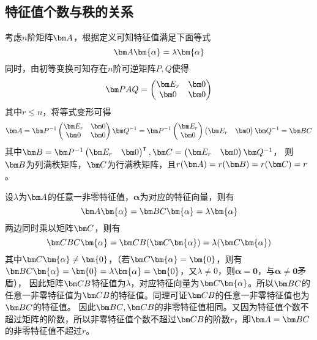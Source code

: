 \subsection{特征值个数与秩的关系}
考虑$n$阶矩阵$\mat{A}$，根据定义可知特征值满足下面等式
\[ \mat{A}\bm{\alpha} = \lambda\bm{\alpha} \]
同时，由初等变换可知存在$n$阶可逆矩阵$P,Q$使得
\[
    \mat{PAQ} =
    \begin{pmatrix}
        \mat{E_r} & \mat{0} \\
        \mat{0}   & \mat{0}
    \end{pmatrix}
\]
其中$r\leq n$，将等式变形可得
\[
    \mat{A} =
    \mat{P}^{-1}
    \begin{pmatrix}
        \mat{E_r} & \mat{0} \\
        \mat{0}   & \mat{0}
    \end{pmatrix}
    \mat{Q}^{-1}
    =
    \mat{P}^{-1}
    \begin{pmatrix}
        \mat{E_r} \\ \mat{0}
    \end{pmatrix}
    \begin{pmatrix}
        \mat{E_r} & \mat{0}
    \end{pmatrix}
    \mat{Q}^{-1}
    =\mat{BC}
\]
其中$\mat{B}=\mat{P}^{-1}\begin{pmatrix}\mat{E_r} & \mat{0}\end{pmatrix}^\intercal, \mat{C} = \begin{pmatrix}\mat{E_r} & \mat{0}\end{pmatrix}\mat{Q}^{-1}$，
则$\mat{B}$为列满秩矩阵，$\mat{C}$为行满秩矩阵，且$r(\mat{A}) = r(\mat{B}) = r(\mat{C}) = r$。

设$\lambda$为$\mat{A}$的任意一非零特征值，$\bm{\alpha}$为对应的特征向量，则有
\[ \mat{A}\bm{\alpha} = \mat{BC}\bm{\alpha} = \lambda\bm{\alpha} \]
两边同时乘以矩阵$\mat{C}$，则有
\[ \mat{CBC}\bm{\alpha} = \mat{CB}(\mat{C}\bm{\alpha}) = \lambda(\mat{C}\bm{\alpha}) \]
其中$\mat{C}\bm{\alpha}\neq \bm{0}$，（若$\mat{C}\bm{\alpha} = \bm{0}$，则有$\mat{BC}\bm{\alpha} = \bm{0} = \lambda\bm{\alpha} = \bm{0}$，又$\lambda\neq 0$，则$\bm{\alpha}=\bm{0}$，与$\bm{\alpha}\neq \bm{0}$矛盾），
因此矩阵$\mat{CB}$特征值为$\lambda$，对应特征向量为$\mat{C}\bm{\alpha}$。所以$\mat{BC}$的任意一非零特征值为$\mat{CB}$的特征值。同理可证$\mat{CB}$的任意一非零特征值也为$\mat{BC}$的特征值。
因此$\mat{BC},\mat{CB}$的非零特征值相同。又因为特征值个数不超过矩阵的阶数，所以非零特征值个数不超过$\mat{CB}$的阶数$r$，即$\mat{A}=\mat{BC}$的非零特征值不超过$r$。

